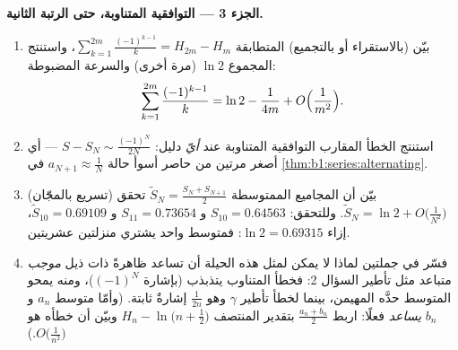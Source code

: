 \begin{problem}[{مسألة نهاية الأسبوع --- $H_n = \ln n + \gamma +
\frac{1}{2n} + O(n^{-2})$، وإعادة ترتيب $1 - \frac12 +
\frac13 - \dots$ إلى $\frac{\ln 2}{2}$}]
\medskip
\noindent\textbf{الجزء 3 ---  التوافقية المتناوبة،
حتى الرتبة الثانية.}
\begin{enumerate}[resume]
  \item بيّن (بالاستقراء أو بالتجميع) المتطابقة
        $\sum_{k=1}^{2m} \frac{(-1)^{k-1}}{k} = H_{2m} - H_m$،
        واستنتج المجموع $\ln 2$ (مرة أخرى) والسرعة
        المضبوطة:
        \[
        \sum_{k=1}^{2m} \frac{(-1)^{k-1}}{k}
        = \ln 2 - \frac{1}{4m} + O\Bigl(\frac{1}{m^2}\Bigr) .
        \]
  \item استنتج الخطأ المقارب  التوافقية
        المتناوبة عند \emph{أيّ} دليل: $S - S_N \sim
        \frac{(-1)^N}{2N}$ --- أي أصغر مرتين من حاصر
        أسوأ حالة $a_{N+1} \approx \frac1N$ في
        \cref{thm:b1:series:alternating}.
  \item (تسريع بالمجّان) بيّن أن المجاميع الممتوسطة
        $\tilde S_N = \frac{S_N + S_{N+1}}{2}$ تحقق $\tilde
        S_N = \ln 2 + O\bigl(\frac{1}{N^2}\bigr)$. وللتحقق: $S_{10}
        = 0.64563$ و $S_{11} = 0.73654$ و $\tilde S_{10} =
        0.69109$، إزاء $\ln 2 = 0.69315$: فمتوسط واحد يشتري
        منزلتين عشريتين.
  \item فسّر في جملتين لماذا لا يمكن لمثل هذه الحيلة أن تساعد ظاهرةً
        ذات ذيل \emph{موجب} متباعد مثل تأطير السؤال
        2: فخطأ المتناوب يتذبذب (بإشارة
        $(-1)^N$)، ومنه يمحو المتوسط حدَّه المهيمن، بينما
        لخطأ تأطير $\gamma$ وهو $\frac{1}{2n}$ إشارةٌ
        ثابتة. (وأمّا متوسط $a_n$ و $b_n$ \emph{يساعد} فعلًا:
        اربط $\frac{a_n + b_n}{2}$ بتقدير المنتصف
        $H_n - \ln\bigl(n + \frac12\bigr)$ وبيّن أن خطأه هو
        $O\bigl(\frac{1}{n^2}\bigr)$.)
\end{enumerate}


\end{problem}

